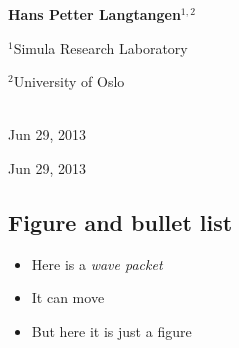 \documentclass[%
oneside,                 %
final,                   %
10pt]{article}
\begin{document}
\begin{center}
\author{Hans Petter Langtangen}

\begin{center}
{\bf Hans Petter Langtangen${}^{1, 2}$} \\ [0mm]
\end{center}

\begin{center}
\centerline{{\small ${}^1$Simula Research Laboratory}}
\centerline{{\small ${}^2$University of Oslo}}
\end{center}


\date{Jun 29, 2013}
\maketitle
\date{Jun 29, 2013
}

\ \\ [10mm]
{\large\textsf{Jun 29, 2013}}

\end{center}
\vfill
\clearpage

\begin{center}
Jun 29, 2013
\end{center}

\vspace{1cm}




\subsection{Figure and bullet list}


\begin{itemize}
  \item Here is a \emph{wave packet}

  \item It can move

  \item But here it is just a figure
\end{itemize}

\noindent
\end{document}
